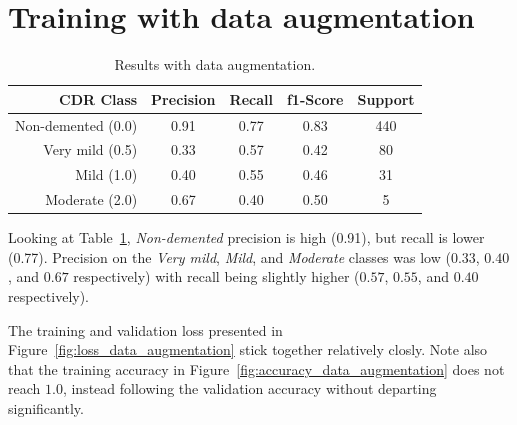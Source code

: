\documentclass{kththesis}
\begin{document}
\section{Training with data augmentation}

\begin{table}[H]
  \begin{center}
    \caption{Results with data augmentation. \label{tab:results_data_augmentation}}
    \begin{tabular}{r|ccc|c}
      \textbf{CDR Class} & \textbf{Precision} & \textbf{Recall} & \textbf{f1-Score} & \textbf{Support} \\
      \toprule
           Non-demented (0.0) &  0.91   &  0.77  &   0.83   &   440 \\
           Very mild (0.5) &  0.33   &  0.57  &   0.42   &    80 \\
           Mild (1.0)         &  0.40   &  0.55  &   0.46   &    31 \\
           Moderate (2.0)     &  0.67   &  0.40  &   0.50   &     5 \\
    \end{tabular}
  \end{center}
\end{table}

Looking at Table~\ref{tab:results_data_augmentation}, \textit{Non-demented} precision is high (0.91), but recall is lower (0.77). Precision on the \textit{Very mild}, \textit{Mild}, and \textit{Moderate} classes was low ($0.33$, $0.40$, and $0.67$ respectively) with recall being slightly higher ($0.57$, $0.55$, and $0.40$ respectively).

The training and validation loss presented in Figure~\ref{fig:loss_data_augmentation} stick together relatively closly. Note also that the training accuracy in Figure~\ref{fig:accuracy_data_augmentation} does not reach $1.0$, instead following the validation accuracy without departing significantly.
\newpage
\end{document}
